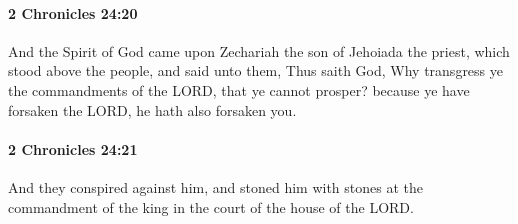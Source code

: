 		\paragraph{2 Chronicles 24:20} %
			\label{2CHRONICLES-24-20}

			And the Spirit of God came upon Zechariah the son of Jehoiada the priest, which stood above the people, and said unto them, Thus saith God, Why transgress ye the commandments of the LORD, that ye cannot prosper? because ye have forsaken the LORD, he hath also forsaken you.


		\paragraph{2 Chronicles 24:21} %
			\label{2CHRONICLES-24-21}

			And they conspired against him, and stoned him with stones at the commandment of the king in the court of the house of the LORD.

